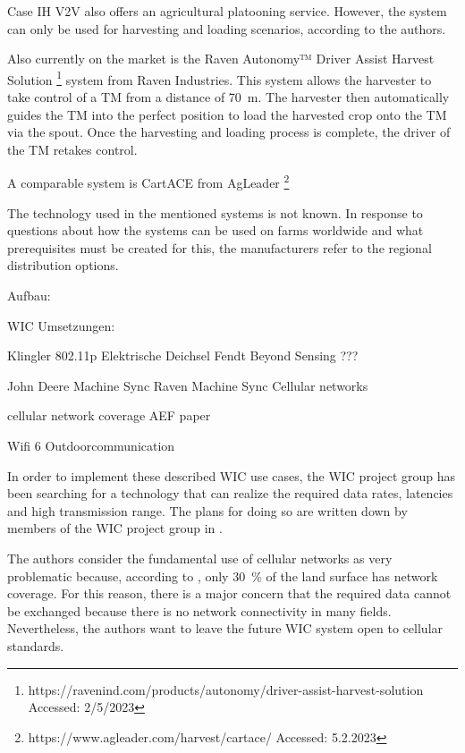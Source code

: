 Case IH V2V also offers an agricultural platooning service. However, the system can only be used for harvesting and loading scenarios, according to the authors.

Also currently on the market is the Raven Autonomy™ Driver Assist Harvest Solution \footnote{https://ravenind.com/products/autonomy/driver-assist-harvest-solution Accessed: 2/5/2023} system from Raven Industries. This system allows the harvester to take control of a \ac{TM} from a distance of \SI{70}{\metre}. The harvester then automatically guides the \ac{TM} into the perfect position to load the harvested crop onto the \ac{TM} via the spout. Once the harvesting and loading process is complete, the driver of the \ac{TM} retakes control. 

A comparable system is CartACE from AgLeader \footnote{https://www.agleader.com/harvest/cartace/ Accessed: 5.2.2023}

The technology used in the mentioned systems is not known. In response to questions about how the systems can be used on farms worldwide and what prerequisites must be created for this, the manufacturers refer to the regional distribution options. 



Aufbau:

WIC Umsetzungen: 

Klingler 802.11p
Elektrische Deichsel Fendt
Beyond Sensing ???

John Deere Machine Sync
Raven Machine Sync
Cellular networks

cellular network coverage AEF paper 

Wifi 6 Outdoorcommunication



In order to implement these described \ac{WIC} use cases, the \ac{WIC} project group has been searching for a technology that can realize the required data rates, latencies and high transmission range. The plans for doing so are written down by members of the \ac{WIC} project group in \cite{schlingmann_challenges_2017}.

The authors consider the fundamental use of cellular networks as very problematic because, according to \cite{noauthor_ict_2016}, only \SI{30}{\percent} of the land surface has network coverage. For this reason, there is a major concern that the required data cannot be exchanged because there is no network connectivity in many fields. Nevertheless, the authors want to leave the future \ac{WIC} system open to cellular standards.

